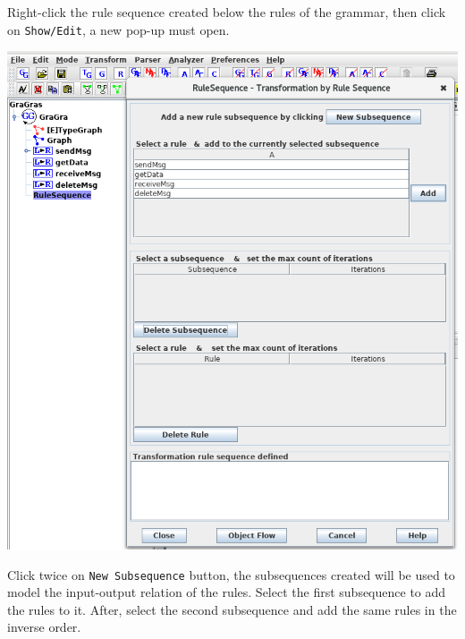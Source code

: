 \documentclass[12pt]{article}
\newenvironment{tutorialstep}
	{\hspace{-\parindent}\begin{minipage}{\textwidth}}
    {\vspace{.3cm}\end{minipage}}
\begin{document}
\begin{tutorialstep}
  Right-click the rule sequence created below the rules of the grammar, then click on \texttt{Show/Edit}, a new pop-up must open.\\

  \begin{center}
  \noindent
  \centering
  \includegraphics[scale = 0.5]{img/concurrent-rules/rule-sequence_02.png}\\
  \end{center}
  
  Click twice on \texttt{New Subsequence} button, the subsequences created will be used to model the input-output relation of the rules. Select the first subsequence to add the rules to it. After, select the second subsequence and add the same rules in the inverse order.
\end{tutorialstep}
\end{document}
